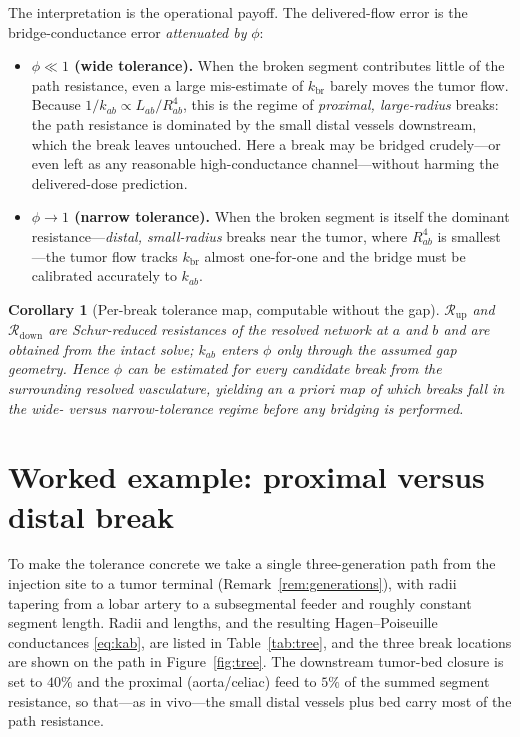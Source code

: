 \documentclass[11pt]{article}
\newtheorem{corollary}{Corollary}
\newcommand{\Rup}{\mathcal{R}_{\mathrm{up}}}
\newcommand{\Rdown}{\mathcal{R}_{\mathrm{down}}}
\newcommand{\kbr}{k_{\mathrm{br}}}
\begin{document}
\noindent
The interpretation is the operational payoff. The delivered-flow error is the
bridge-conductance error \emph{attenuated by} $\phi$:
\begin{itemize}
\item \textbf{$\phi \ll 1$ (wide tolerance).} When the broken segment contributes
little of the path resistance, even a large mis-estimate of $\kbr$ barely moves the
tumor flow. Because $1/k_{ab}\propto L_{ab}/R_{ab}^4$, this is the regime of
\emph{proximal, large-radius} breaks: the path resistance is dominated by the small
distal vessels downstream, which the break leaves untouched. Here a break may be
bridged crudely---or even left as any reasonable high-conductance channel---without
harming the delivered-dose prediction.
\item \textbf{$\phi \to 1$ (narrow tolerance).} When the broken segment is itself
the dominant resistance---\emph{distal, small-radius} breaks near the tumor, where
$R_{ab}^4$ is smallest---the tumor flow tracks $\kbr$ almost one-for-one and the
bridge must be calibrated accurately to $k_{ab}$.
\end{itemize}

\begin{corollary}[Per-break tolerance map, computable without the gap]
\label{cor:map}
$\Rup$ and $\Rdown$ are Schur-reduced resistances of the \emph{resolved} network
at $a$ and $b$ and are obtained from the intact solve; $k_{ab}$ enters $\phi$ only
through the assumed gap geometry. Hence $\phi$ can be estimated for every candidate
break from the surrounding resolved vasculature, yielding an a priori map of which
breaks fall in the wide- versus narrow-tolerance regime before any bridging is
performed.
\end{corollary}

\section{Worked example: proximal versus distal break}
\label{sec:example}

To make the tolerance concrete we take a single three-generation path from the
injection site to a tumor terminal (Remark~\ref{rem:generations}), with radii
tapering from a lobar artery to a subsegmental feeder and roughly constant segment
length. Radii and lengths, and the resulting Hagen--Poiseuille conductances
\eqref{eq:kab}, are listed in Table~\ref{tab:tree}, and the three break locations are
shown on the path in Figure~\ref{fig:tree}. The downstream tumor-bed
closure is set to $40\%$ and the proximal (aorta/celiac) feed to $5\%$ of the summed
segment resistance, so that---as in vivo---the small distal vessels plus bed carry
most of the path resistance.
\end{document}
